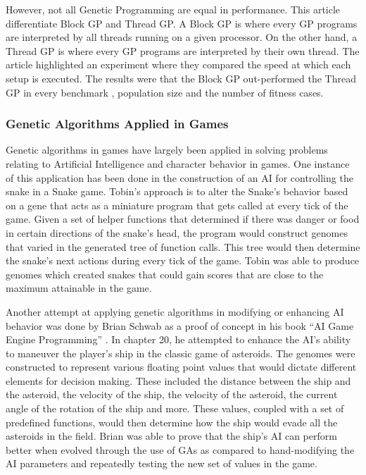 	However, not all Genetic Programming are equal in performance.  This article  differentiate Block GP and Thread GP\cite{Robbilliard09}.  A Block GP is where every GP programs are 
	interpreted by all threads running on a given processor.  On the other hand, a Thread GP is where every GP programs are interpreted by their own thread.  The article 
	highlighted an experiment where they compared the speed at which each setup is executed.  The results were that the Block GP out-performed the Thread GP in every benchmark , 
	population size and the number of fitness cases.

\subsubsection*{Genetic Algorithms Applied in Games}	

	Genetic algorithms in games have largely been applied in solving problems relating to Artificial Intelligence and character behavior in games. One instance of this application 
	has been done in the construction of an AI for controlling the snake in a Snake game\cite{website:Ehlis00}. Tobin's approach is to alter the Snake's behavior based on a gene that acts as a miniature 
	program that gets called at every tick of the game. Given a set of helper functions that determined if there was danger or food in certain directions of the snake's head, the program 
	would construct genomes that varied in the generated tree of function calls. This tree would then determine the snake's next actions during every tick of the game. Tobin was able to 
	produce genomes which created snakes that could gain scores that are close to the maximum attainable in the game.  

	Another attempt at applying genetic algorithms in modifying or 
	enhancing AI behavior was done by Brian Schwab as a proof of concept in his book “AI Game Engine Programming” \cite{Schwab04}. In chapter 20, he attempted to enhance the AI's ability to maneuver 
	the player's ship in the classic game of asteroids. The genomes were constructed to represent various floating point values that would dictate different elements for decision making. 
	These included the distance between the ship and the asteroid, the velocity of the ship, the velocity of the asteroid, the current angle of the rotation of the ship and more. 
	These values, coupled with a set of predefined functions, would then determine how the ship would evade all the asteroids in the field. Brian was able to prove that the ship's AI can 
	perform better when evolved through the use of GAs as compared to hand-modifying the AI parameters and repeatedly testing the new set of values in the game.
	
